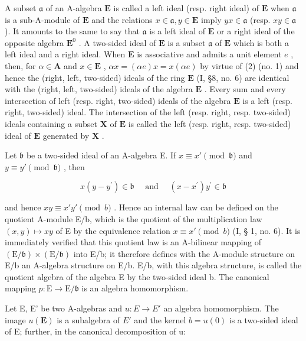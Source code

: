 A subset \(\mathfrak{a}\) of an A-algebra \(\mathbf{E}\) is called a left ideal (resp. right ideal) of \(\mathbf{E}\) when \(\mathfrak{a}\) is a sub-A-module of \(\mathbf{E}\) and the relations \(x \in \mathfrak{a}, y \in \mathbf{E}\) imply \(yx \in \mathfrak{a}\) (resp. \(xy \in \mathfrak{a}\) ). It amounts to the same to say that \(\mathfrak{a}\) is a left ideal of \(\mathbf{E}\) or a right ideal of the opposite algebra \(\mathbf{E}^0\) . A two-sided ideal of \(\mathbf{E}\) is a subset \(\mathfrak{a}\) of \(\mathbf{E}\) which is both a left ideal and a right ideal. When \(\mathbf{E}\) is associative and admits a unit element \(e\) , then, for \(\alpha \in \mathbf{A}\) and \(x \in \mathbf{E}\) , \(\alpha x = (\alpha e)x = x(\alpha e)\) by virtue of (2) (no. 1) and hence the (right, left, two-sided) ideals of the ring \(\mathbf{E}\) (I, §8, no. 6) are identical with the (right, left, two-sided) ideals of the algebra \(\mathbf{E}\) . Every sum and every intersection of left (resp. right, two-sided) ideals of the algebra \(\mathbf{E}\) is a left (resp. right, two-sided) ideal. The intersection of the left (resp. right, resp. two-sided) ideals containing a subset \(\mathbf{X}\) of \(\mathbf{E}\) is called the left (resp. right, resp. two-sided) ideal of \(\mathbf{E}\) generated by \(\mathbf{X}\) .

Let \(\mathfrak{b}\) be a two-sided ideal of an A-algebra E. If \(x \equiv x'\pmod{\mathfrak{b}}\) and \(y \equiv y'\pmod{\mathfrak{b}}\) , then

\[
x (y - y ^ {\prime}) \in \mathfrak {b} \quad \text { and } \quad (x - x ^ {\prime}) y ^ {\prime} \in \mathfrak {b}
\]

and hence \(xy \equiv x'y' \pmod{b}\) . Hence an internal law can be defined on the quotient A-module E/b, which is the quotient of the multiplication law \((x,y) \mapsto xy\) of E by the equivalence relation \(x \equiv x' \pmod{b}\) (I, § 1, no. 6). It is immediately verified that this quotient law is an A-bilinear mapping of \((\mathrm{E} / \mathfrak{b}) \times (\mathrm{E} / \mathfrak{b})\) into E/b; it therefore defines with the A-module structure on E/b an A-algebra structure on E/b. E/b, with this algebra structure, is called the quotient algebra of the algebra E by the two-sided ideal b. The canonical mapping \(p: \mathrm{E} \to \mathrm{E} / \mathfrak{b}\) is an algebra homomorphism.

Let E, E' be two A-algebras and \(u:E \rightarrow E'\) an algebra homomorphism. The image \(u(\mathbf{E})\) is a subalgebra of \(E'\) and the kernel \(b = u(0)\) is a two-sided ideal of E; further, in the canonical decomposition of u:


